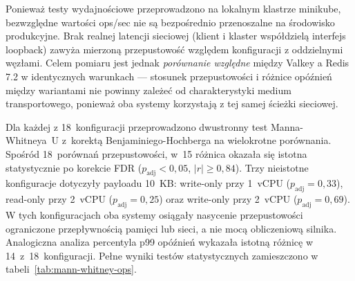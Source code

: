 Ponieważ testy wydajnościowe przeprowadzono na lokalnym klastrze minikube, bezwzględne wartości ops/sec nie są bezpośrednio przenoszalne na środowisko produkcyjne. Brak realnej latencji sieciowej (klient i klaster współdzielą interfejs loopback) zawyża mierzoną przepustowość względem konfiguracji z oddzielnymi węzłami. Celem pomiaru jest jednak \textit{porównanie względne} między Valkey a Redis 7.2 w identycznych warunkach --- stosunek przepustowości i różnice opóźnień między wariantami nie powinny zależeć od charakterystyki medium transportowego, ponieważ oba systemy korzystają z tej samej ścieżki sieciowej.

Dla każdej z 18~konfiguracji przeprowadzono dwustronny test Manna-Whitneya~U z~korektą Benjaminiego-Hochberga na wielokrotne porównania. Spośród 18~porównań przepustowości, w~15 różnica okazała się istotna statystycznie po korekcie FDR ($p_{\mathrm{adj}} < 0{,}05$, $|r| \geq 0{,}84$). Trzy nieistotne konfiguracje dotyczyły payloadu 10~KB: write-only przy 1~vCPU ($p_{\mathrm{adj}} = 0{,}33$), read-only przy 2~vCPU ($p_{\mathrm{adj}} = 0{,}25$) oraz write-only przy 2~vCPU ($p_{\mathrm{adj}} = 0{,}69$). W tych konfiguracjach oba systemy osiągały nasycenie przepustowości ograniczone przepływnością pamięci lub sieci, a nie mocą obliczeniową silnika. Analogiczna analiza percentyla p99 opóźnień wykazała istotną różnicę w 14~z~18~konfiguracji. Pełne wyniki testów statystycznych zamieszczono w tabeli~\ref{tab:mann-whitney-ops}.

\FloatBarrier

